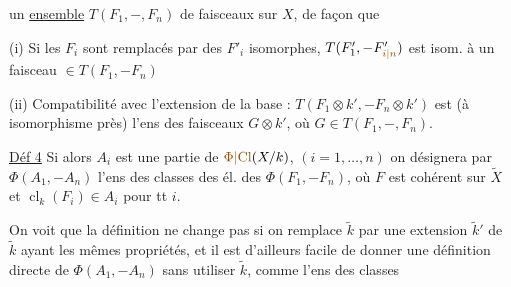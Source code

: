 un \uline{ensemble} $T(F_1,-,F_n)$ de  faisceaux  sur $X$, de façon que

(i) Si les $F_i$ sont remplacés par des $F'_i$ isomorphes,  $T(F'_1,-F'_{\unsure{i|n}})$ est isom. à  un faisceau $\in T(F_1,-F_n)$

(ii) Compatibilité avec l'extension de la base : $T(F_1\otimes k',-F_n\otimes k')$ est (à isomorphisme près) l'ens des faisceaux $G\otimes k'$, où $G\in T(F_1,-,F_n)$.

\uline{Déf 4} Si alors $A_i$ est une partie de $\unsure{\Phi|\mathrm{Cl}}(X/k)$, $(i=1,\ldots,n)$ on désignera par $\Phi(A_1,-A_n)$ l'ens des classes  des él. des $\Phi(F_1,-F_n)$, où $F$ est cohérent sur $\widetilde X$ et $\operatorname{cl}_k(F_i)\in A_i$ pour tt $i$.

On voit  que la définition ne change pas si on remplace $\widetilde k$ par une extension $\widetilde k'$ de $\widetilde k$ ayant les mêmes propriétés, et il est d'ailleurs facile de donner une définition directe de $\Phi(A_1,-A_n)$ sans utiliser $\widetilde k$, comme l'ens des classes
